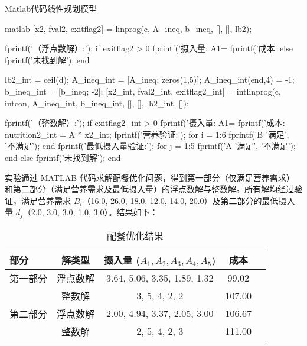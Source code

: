 \begin{codebox}{Matlab代码}{线性规划模型}
\begin{amzcode}{matlab}
        [x2, fval2, exitflag2] = linprog(c, A_ineq, b_ineq, [], [], lb2);
        
        fprintf('（浮点数解）:\n');
        if exitflag2 > 0
            fprintf('摄入量: A1=%
            fprintf('成本: %
        else
            fprintf('未找到解\n');
        end
        
        lb2_int = ceil(d);
        A_ineq_int = [A_ineq; zeros(1,5)];
        A_ineq_int(end,4) = -1;
        b_ineq_int = [b_ineq; -2];
        [x2_int, fval2_int, exitflag2_int] = intlinprog(c, intcon, A_ineq_int, b_ineq_int, [], [], lb2_int, []);
        
        fprintf('（整数解）:\n');
        if exitflag2_int > 0
            fprintf('摄入量: A1=%
            fprintf('成本: %
            nutrition2_int = A * x2_int;
            fprintf('营养验证:\n');
            for i = 1:6
                fprintf('B%
                        '满足', '不满足');
            end
            fprintf('最低摄入量验证:\n');
            for j = 1:5
                fprintf('A%
                        '满足', '不满足');
            end
        else
            fprintf('未找到解\n');
        end
    \end{amzcode}
\end{codebox}

实验通过 MATLAB 代码求解配餐优化问题，得到第一部分（仅满足营养需求）和第二部分（满足营养需求及最低摄入量）的浮点数解与整数解。所有解均经过验证，满足营养需求 \( B_i \)（16.0, 26.0, 18.0, 12.0, 14.0, 20.0）及第二部分的最低摄入量 \( d_j \)（2.0, 3.0, 3.0, 1.0, 3.0）。结果如下：

\begin{table}[H]
    \centering
    \renewcommand{\arraystretch}{1.5}
    \caption{配餐优化结果}
    \begin{tabular}{lcccc}
        \toprule
        \textbf{部分} & \textbf{解类型} & \textbf{摄入量} (\( A_1, A_2, A_3, A_4, A_5 \)) & \textbf{成本} \\
        \midrule
        第一部分 & 浮点数解 & 3.64, 5.06, 3.35, 1.89, 1.32 & 99.02 \\
                 & 整数解   & 3, 5, 4, 2, 2 & 107.00 \\
        \midrule
        第二部分 & 浮点数解 & 2.00, 4.94, 3.37, 2.05, 3.00 & 106.67 \\
                 & 整数解   & 2, 5, 4, 2, 3 & 111.00 \\
        \bottomrule
    \end{tabular}
\end{table}

